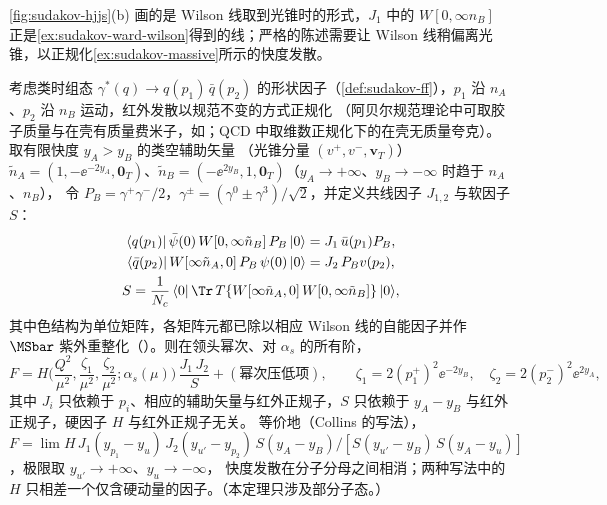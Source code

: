 \cref{fig:sudakov-hjjs}(b) 画的是 Wilson 线取到光锥时的形式，$J_1$ 中的 $W[0,\infty n_B]$ 正是\cref{ex:sudakov-ward-wilson}得到的线；严格的陈述需要让 Wilson 线稍偏离光锥，以正规化\cref{ex:sudakov-massive}所示的快度发散。

\begin{theorem}\label{thm:sudakov-factorization}
考虑类时组态 $\gamma^*(q)\to q(p_1)\,\bar q(p_2)$ 的形状因子（\cref{def:sudakov-ff}），$p_1$ 沿 $n_A$、$p_2$ 沿 $n_B$ 运动，红外发散以规范不变的方式正规化
（阿贝尔规范理论中可取胶子质量与在壳有质量费米子，如\cite[第~10~章]{Collins2011}；QCD 中取维数正规化下的在壳无质量夸克）。取有限快度 $y_A>y_B$ 的类空辅助矢量
（光锥分量 $(v^+,v^-,\mathbf v_T)$）$\tilde n_A=(1,-\ee^{-2y_A},\mathbf 0_T)$、$\tilde n_B=(-\ee^{2y_B},1,\mathbf 0_T)$（$y_A\to+\infty$、$y_B\to-\infty$ 时趋于 $n_A$、$n_B$），
令 $P_B=\gamma^+\gamma^-/2$，$\gamma^\pm=(\gamma^0\pm\gamma^3)/\sqrt2$，并定义共线因子 $J_{1,2}$ 与软因子 $S$：
\begin{equation}\label{eq:sudakov-JS}
\begin{gathered}
\langle q(p_1)|\,\bar\psi(0)\,W[0,\infty\tilde n_B]\,P_B\,|0\rangle=J_1\,\bar u(p_1)P_B,\\
\langle\bar q(p_2)|\,W[\infty\tilde n_A,0]\,P_B\,\psi(0)\,|0\rangle=J_2\,P_Bv(p_2),\\
S=\frac1{N_c}\,\langle0|\,\Tr\,T\{W[\infty\tilde n_A,0]\,W[0,\infty\tilde n_B]\}\,|0\rangle ,
\end{gathered}
\end{equation}
其中色结构为单位矩阵，各矩阵元都已除以相应 Wilson 线的自能因子并作 $\MSbar$ 紫外重整化（\cite[式~(10.89)--(10.92)、(10.101)]{Collins2011}）。则在领头幂次、对 $\alpha_s$ 的所有阶，
\begin{equation}\label{eq:sudakov-fact}
F=H\Big(\frac{Q^2}{\mu^2},\frac{\zeta_1}{\mu^2},\frac{\zeta_2}{\mu^2};\alpha_s(\mu)\Big)\,\frac{J_1\,J_2}{S}+(\text{幂次压低项}),\qquad
\zeta_1=2(p_1^+)^2\ee^{-2y_B},\quad\zeta_2=2(p_2^-)^2\ee^{2y_A},
\end{equation}
其中 $J_i$ 只依赖于 $p_i$、相应的辅助矢量与红外正规子，$S$ 只依赖于 $y_A-y_B$ 与红外正规子，硬因子 $H$ 与红外正规子无关。
等价地（Collins 的写法），$F=\lim H\,J_1(y_{p_1}-y_{u})\,J_2(y_{u'}-y_{p_2})\,S(y_A-y_B)/[S(y_{u'}-y_B)\,S(y_A-y_u)]$，极限取 $y_{u'}\to+\infty$、$y_u\to-\infty$，
快度发散在分子分母之间相消\cite[式~(10.109)]{Collins2011}；两种写法中的 $H$ 只相差一个仅含硬动量的因子。（本定理只涉及部分子态。）
\end{theorem}


